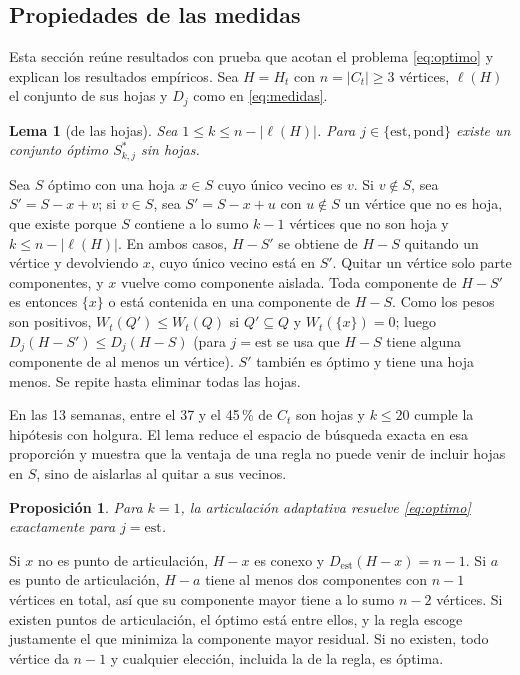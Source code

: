 \documentclass[journal]{IEEEtran}
\newtheorem{proposicion}{Proposición}
\newtheorem{lema}{Lema}
\begin{document}
\subsection{Propiedades de las medidas}
\label{sec:teoria}

Esta sección reúne resultados con prueba que acotan el problema
\eqref{eq:optimo} y explican los resultados empíricos. Sea $H=H_t$ con
$n=|C_t|\geq3$ vértices, $\ell(H)$ el conjunto de sus hojas y $D_j$ como en
\eqref{eq:medidas}.

\begin{lema}[de las hojas]\label{lem:hojas}
Sea $1\leq k\leq n-|\ell(H)|$. Para $j\in\{\mathrm{est},\mathrm{pond}\}$ existe
un conjunto óptimo $S^\ast_{k,j}$ sin hojas.
\end{lema}

\begin{IEEEproof}[Prueba]
Sea $S$ óptimo con una hoja $x\in S$ cuyo único vecino es $v$. Si $v\notin S$,
sea $S'=S-x+v$; si $v\in S$, sea $S'=S-x+u$ con $u\notin S$ un vértice que no
es hoja, que existe porque $S$ contiene a lo sumo $k-1$ vértices que no son
hoja y $k\leq n-|\ell(H)|$. En ambos casos, $H-S'$ se obtiene de $H-S$
quitando un vértice y devolviendo $x$, cuyo único vecino está en $S'$. Quitar
un vértice solo parte componentes, y $x$ vuelve como componente aislada.
Toda componente de $H-S'$ es entonces $\{x\}$ o está contenida en una componente
de $H-S$. Como los pesos son positivos, $W_t(Q')\leq W_t(Q)$ si $Q'\subseteq Q$
y $W_t(\{x\})=0$; luego $D_j(H-S')\leq D_j(H-S)$ (para $j=\mathrm{est}$ se usa
que $H-S$ tiene alguna componente de al menos un vértice). $S'$ también es
óptimo y tiene una hoja menos. Se repite hasta eliminar todas las hojas.
\end{IEEEproof}

En las 13 semanas, entre el 37 y el 45\,\% de $C_t$ son hojas y $k\leq20$
cumple la hipótesis con holgura. El lema reduce el espacio de búsqueda exacta
en esa proporción y muestra que la ventaja de una regla no puede venir de
incluir hojas en $S$, sino de aislarlas al quitar a sus vecinos.

\begin{proposicion}\label{prop:art}
Para $k=1$, la articulación adaptativa resuelve \eqref{eq:optimo} exactamente
para $j=\mathrm{est}$.
\end{proposicion}

\begin{IEEEproof}[Prueba]
Si $x$ no es punto de articulación, $H-x$ es conexo y $D_{\mathrm{est}}(H-x)=n-1$.
Si $a$ es punto de articulación, $H-a$ tiene al menos dos componentes con $n-1$
vértices en total, así que su componente mayor tiene a lo sumo $n-2$ vértices.
Si existen puntos de articulación, el óptimo está entre ellos, y la regla
escoge justamente el que minimiza la componente mayor residual. Si no existen,
todo vértice da $n-1$ y cualquier elección, incluida la de la regla, es
óptima.
\end{IEEEproof}
\end{document}
